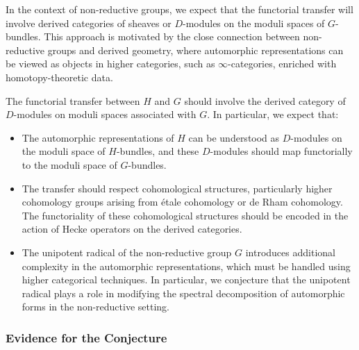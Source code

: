\documentclass{article}
\theoremstyle{remark}
\begin{document}
In the context of non-reductive groups, we expect that the functorial transfer will involve derived categories of sheaves or $D$-modules on the moduli spaces of $G$-bundles. This approach is motivated by the close connection between non-reductive groups and derived geometry, where automorphic representations can be viewed as objects in higher categories, such as $\infty$-categories, enriched with homotopy-theoretic data.

The functorial transfer between $H$ and $G$ should involve the derived category of $D$-modules on moduli spaces associated with $G$. In particular, we expect that:
\begin{itemize}
    \item The automorphic representations of $H$ can be understood as $D$-modules on the moduli space of $H$-bundles, and these $D$-modules should map functorially to the moduli space of $G$-bundles.
    \item The transfer should respect cohomological structures, particularly higher cohomology groups arising from étale cohomology or de Rham cohomology. The functoriality of these cohomological structures should be encoded in the action of Hecke operators on the derived categories.
    \item The unipotent radical of the non-reductive group $G$ introduces additional complexity in the automorphic representations, which must be handled using higher categorical techniques. In particular, we conjecture that the unipotent radical plays a role in modifying the spectral decomposition of automorphic forms in the non-reductive setting.
\end{itemize}

\subsubsection{Evidence for the Conjecture}
\end{document}
